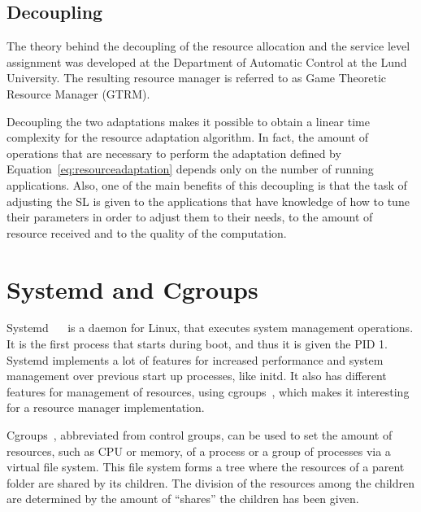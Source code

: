 \documentclass[nobiblatex]{LTHthesis}
\begin{document}
\subsection{Decoupling}

The theory behind the decoupling of the resource allocation and the service
level assignment was developed at the Department of Automatic Control at
the Lund University. The resulting resource manager is referred to as Game 
Theoretic Resource Manager (GTRM).

Decoupling the two adaptations makes it possible to obtain a linear time
complexity for the resource adaptation algorithm. In fact, the amount of
operations that are necessary to perform the adaptation defined by
Equation~\eqref{eq:resourceadaptation} depends only on the number of
running applications. Also, one of the main benefits of this decoupling is
that the task of adjusting the SL is given to the applications that have
knowledge of how to tune their parameters in order to adjust them to their
needs, to the amount of resource received and to the quality of the 
computation.

\section{Systemd and Cgroups}

Systemd ~\cite{sysd1}~\cite{sysd2} is a daemon for Linux, that executes system management
operations. It is the first process that starts during boot, and thus it is
given the PID 1. Systemd implements a lot of features for increased
performance and system management over previous start up processes, like
initd. It also has different features for management of resources, using
cgroups~\cite{cgroups}, which makes it interesting for a resource manager
implementation. 

Cgroups~\cite{cgroups}, abbreviated from control groups, can be used to set
the amount of resources, such as CPU or memory, of a process or a group of
processes via a virtual file system. This file system forms a tree where the
resources of a parent folder are shared by its children. The division of the
resources among the children are determined by the amount of ``shares'' the
children has been given. 
\end{document}
